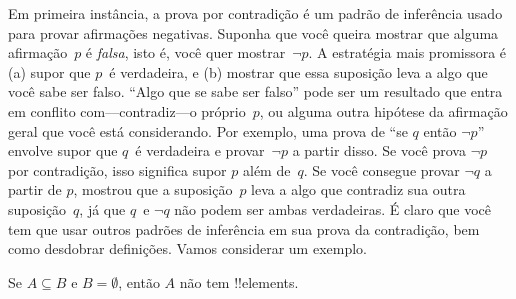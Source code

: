 \documentclass[../../../include/open-logic-section]{subfiles}
\begin{document}


Em primeira instância, a prova por contradição é um padrão de inferência
usado para provar afirmações negativas.  Suponha que você queira mostrar que
alguma afirmação~$p$ é \emph{falsa}, isto é, você quer mostrar~$\lnot p$.  A
estratégia mais promissora é (a) supor que $p$~é verdadeira, e (b)
mostrar que essa suposição leva a algo que você sabe ser falso.
``Algo que se sabe ser falso'' pode ser um resultado que entra em conflito
com---contradiz---o próprio~$p$, ou alguma outra hipótese da
afirmação geral que você está considerando.  Por exemplo, uma prova de ``se $q$
então $\lnot p$'' envolve supor que $q$~é verdadeira e provar~$\lnot
p$ a partir disso. Se você prova $\lnot p$ por contradição, isso significa
supor $p$ além de~$q$. Se você consegue provar $\lnot q$ a partir de $p$,
mostrou que a suposição~$p$ leva a algo que
contradiz sua outra suposição~$q$, já que $q$~e $\lnot q$ não podem
ser ambas verdadeiras.  É claro que você tem que usar outros padrões de inferência em
sua prova da contradição, bem como desdobrar definições.
Vamos considerar um exemplo.

\begin{prop}
  Se $A \subseteq B$ e $B = \emptyset$, então $A$ não tem !!{element}s.
\end{prop}
\end{document}
